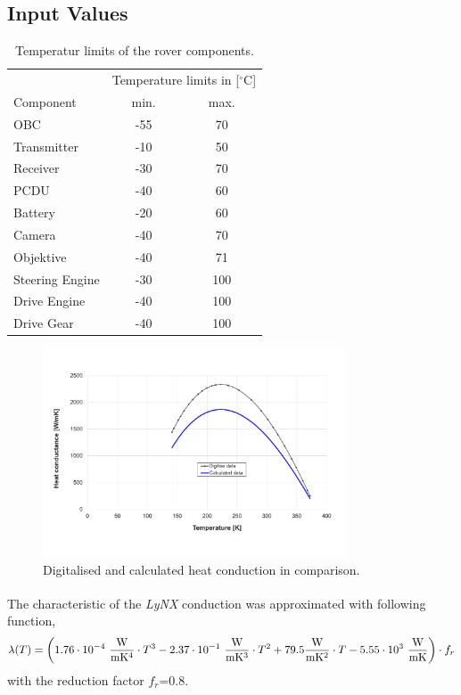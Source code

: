 \subsection{Input Values} \label{sec:app_therm_5}
\begin{table}[H]
	\centering
	\caption{Temperatur limits of the rover components.}
	\begin{tabular}{l@{\qquad\qquad}cc}
		\toprule 
		& \multicolumn{2}{l}{Temperature limits in [$^\circ$C]} \\ 
		Component	&	min. & max. \\ \midrule
		OBC & -55 & 70 \\
		Transmitter & -10 & 50 \\
		Receiver & -30 & 70  \\
		PCDU & -40 & 60  \\
		Battery & -20 & 60 \\
		Camera & -40 & 70  \\
		Objektive  & -40 & 71  \\
		Steering Engine & -30 & 100 \\
		Drive Engine & -40 & 100 \\
		Drive Gear & -40 & 100  \\ \bottomrule
	\end{tabular}
	\label{tab:tcs_limits}
\end{table}

\begin{figure}[H] 
	\centering
	\includegraphics[width=0.8\textwidth]{Media/tcs_lynx_calc}
	\caption{Digitalised \cite{ref_tcs_01} and calculated heat conduction in comparison.}
	\label{fig:tcs_lynx}
\end{figure}
The characteristic of the \textit{LyNX}\textsuperscript{\tiny\textregistered} conduction was approximated with following function,
\begin{equation}
\lambda(T)= \left(1.76 \cdot 10^{-4}\ \frac{\W}{\m \K^4} \cdot T^3 -2.37\cdot 10^{-1}\ \frac{\W}{\m \K^3} \cdot T^2 +79.5 \frac{\W}{\m \K^2} \cdot T -5.55\cdot 10^{3}\ \frac{\W}{\m \K}\right) \cdot f_{r}  
\label{eq:tcs_lynx}
\end{equation}
with the reduction factor $f_{r}$=0.8.

